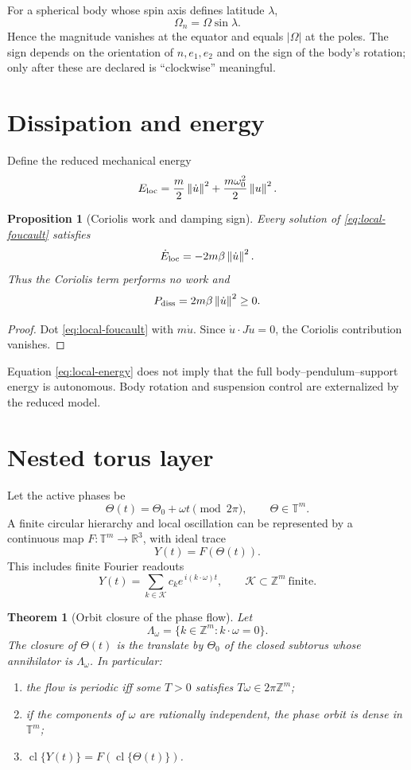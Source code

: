 \documentclass[11pt,a4paper]{article}
\theoremstyle{definition}
\theoremstyle{plain}
\newtheorem{theorem}[definition]{Theorem}
\newtheorem{proposition}[definition]{Proposition}
\theoremstyle{remark}
\newcommand{\R}{\mathbb{R}}
\newcommand{\T}{\mathbb{T}}
\newcommand{\norm}[1]{\left\lVert #1\right\rVert}
\newcommand{\cl}{\operatorname{cl}}
\begin{document}
For a spherical body whose spin axis defines latitude \(\lambda\),
\[
\Omega_n=\Omega\sin\lambda.
\]
Hence the magnitude vanishes at the equator and equals
\(\lvert\Omega\rvert\) at the poles. The sign depends on the
orientation of \(n,e_1,e_2\) and on the sign of the body's rotation;
only after these are declared is ``clockwise'' meaningful.

\section{Dissipation and energy}

Define the reduced mechanical energy
\[
E_{\rm loc}
=\frac m2\norm{\dot u}^2+\frac{m\omega_0^2}{2}\norm u^2.
\]

\begin{proposition}[Coriolis work and damping sign]
Every solution of \cref{eq:local-foucault} satisfies
\begin{equation}\label{eq:local-energy}
\dot E_{\rm loc}
=-2m\beta\norm{\dot u}^2.
\end{equation}
Thus the Coriolis term performs no work and
\[
P_{\rm diss}=2m\beta\norm{\dot u}^2\ge0.
\]
\end{proposition}

\begin{proof}
Dot \cref{eq:local-foucault} with \(m\dot u\). Since
\(\dot u\cdot J\dot u=0\), the Coriolis contribution vanishes.
\end{proof}

Equation \cref{eq:local-energy} does not imply that the full
body--pendulum--support energy is autonomous. Body rotation and
suspension control are externalized by the reduced model.

\section{Nested torus layer}

Let the active phases be
\[
\Theta(t)=\Theta_0+\omega t\pmod{2\pi},
\qquad \Theta\in\T^m .
\]
A finite circular hierarchy and local oscillation can be represented
by a continuous map \(F:\T^m\to\R^3\), with ideal trace
\[
Y(t)=F(\Theta(t)).
\]
This includes finite Fourier readouts
\[
Y(t)=\sum_{k\in\mathcal K}
c_ke^{\,i(k\cdot\omega)t},
\qquad \mathcal K\subset\mathbb Z^m\ \text{finite}.
\]

\begin{theorem}[Orbit closure of the phase flow]
Let
\[
\Lambda_\omega
=\{k\in\mathbb Z^m:k\cdot\omega=0\}.
\]
The closure of \(\Theta(t)\) is the translate by \(\Theta_0\) of the
closed subtorus whose annihilator is \(\Lambda_\omega\). In
particular:
\begin{enumerate}[label=(\roman*)]
  \item the flow is periodic iff some \(T>0\) satisfies
  \(T\omega\in2\pi\mathbb Z^m\);
  \item if the components of \(\omega\) are rationally independent,
  the phase orbit is dense in \(\T^m\);
  \item \(\cl\{Y(t)\}=F(\cl\{\Theta(t)\})\).
\end{enumerate}
\end{theorem}
\end{document}
